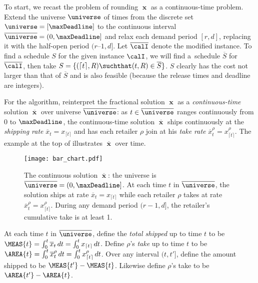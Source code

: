 \newcommand{\rmo}{r\mbox{--}1}

To start, we recast the problem of rounding $\mbfx$ as a continuous-time problem.
Extend the universe $\universe$ of times
from the discrete set $\universe = [\maxDeadline]$
to the continuous interval $\overline\universe = (0,\maxDeadline]$
and relax each demand period $[r,d]$, 
replacing it with the half-open period $(\rmo,d]$.
Let $\overline\calI$ denote the modified instance.
To find a schedule $S$ for the given instance $\calI$,
we will find a~schedule $\overline S$ for $\overline\calI$,
then take $S = \{ (\lceil t \rceil, R)\suchthat (t,R) \in \overline S\}$.
$S$ clearly has the cost not larger than that of $\overline S$
and is also feasible (because the release times and deadline are integers).

For the algorithm, reinterpret the fractional solution $\mbfx$ 
as a {\em continuous-time} solution $\overline\mbfx$ over universe $\overline\universe$:
as $t\in\overline\universe$ ranges continuously from $0$ to $\maxDeadline$,
the continuous-time solution 
$\overline\mbfx$ ships continuously at the {\em shipping rate} $\overline x_t = x_{\lceil t\rceil}$
and has each retailer $\rho$ join at his {\em take rate} 
$\overline x^\rho_t = x^\rho_{\lceil t\rceil}$.
The example at the top of  illustrates $\overline \mbfx$ over time.



\begin{figure}[t]
  \centering
    \texttt{[image: bar\_chart.pdf]}
    \vspace*{-10pt}
    \caption{
      The continuous solution $\overline\mbfx$:
      the universe is $\overline\universe=(0,\maxDeadline]$.
      At each time $t$ in $\overline\universe$,
      the solution ships at rate $\overline x_t= x_{\lceil t\rceil}$
      while each retailer $\rho$ takes at rate $\overline x^\rho_t=x^\rho_{\lceil t \rceil}$.
      During any demand period $(r-1,d]$, the retailer's cumulative take
      is at least 1.
    }
    \label{fig:bar_chart}
\end{figure}



At each time $t$ in $\overline\universe$,
define the {\em total shipped} up to time $t$ to be
$\MEAS{t} = \int_{0}^ t \overline x_t \,dt = \int_0^t x_{\lceil t \rceil}\,dt$.
Define $\rho$'s {\em take} up to time $t$ to be
$\AREA{t} = \int_{0}^ t \overline x^\rho_t \,dt = \int_0^t x^\rho_{\lceil t \rceil}\,dt$.
Over any interval $(t,t']$, define the amount shipped to be $\MEAS{t'}-\MEAS{t}$.
Likewise define $\rho$'s take to be $\AREA{t'}-\AREA{t}$.



